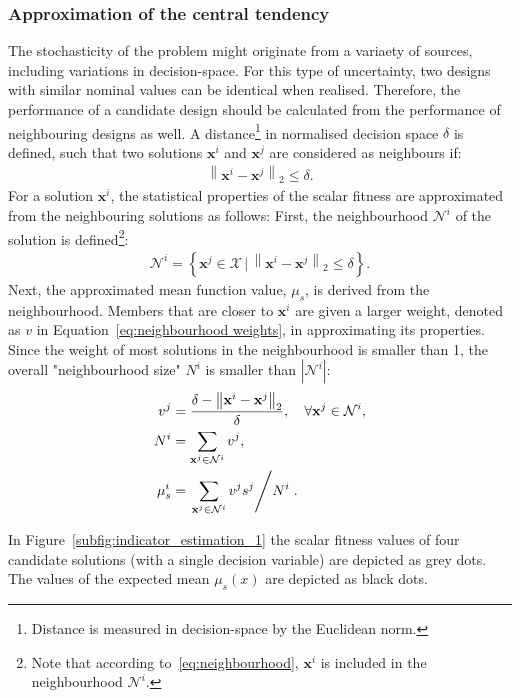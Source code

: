 \documentclass[10pt]{llncs}
\newcommand{\brr}[1]{{\left({#1}\right)}} %
\newcommand{\brf}[1]{\left\lbrace{#1}\right\rbrace} %
\newcommand{\brabs}[1]{\left\vert{#1}\right\vert} %
\newcommand{\norm}[2]{\left\|{#1}\right\|_{#2}} %
\newcommand{\vx}{\mathbf{x}} %
\newcommand{\NSet}{\mathcal{N}} %
\newcommand{\XSet}{\mathcal{X}} %
\begin{document}
\subsubsection{Approximation of the central tendency}
The stochasticity of the problem might originate from a variaety of sources, including variations in decision-space.
For this type of uncertainty, two designs with similar nominal values can be identical when realised.
Therefore, the performance of a candidate design should be calculated from the performance of neighbouring designs as well.
A distance\footnote{Distance is measured in decision-space by the Euclidean norm.} in normalised decision space $\delta$ is defined, such that two solutions $\vx^i$ and $\vx^j$ are considered as neighbours if:
\begin{align}
	\norm{\vx^i-\vx^j}{2}\leq\delta.
\end{align}
For a solution $\vx^i$, the statistical properties of the scalar fitness are approximated from the neighbouring solutions as follows:
First, the neighbourhood $\NSet^i$ of the solution is defined\footnote{Note that according to~\eqref{eq:neighbourhood}, $\vx^i$ is included in the neighbourhood $\NSet^i$.}:
\begin{align}
	\label{eq:neighbourhood}
	\NSet^i=\brf{\vx^j\in \XSet \,\vert \,\norm{\vx^i-\vx^j}{2}\leq\delta}.
\end{align}
Next, the approximated mean function value, $\mu_s$, is derived from the neighbourhood.
Members that are closer to $\vx^i$ are given a larger weight, denoted as $v$ in Equation~\eqref{eq:neighbourhood weights}, in approximating its properties.
Since the weight of most solutions in the neighbourhood is smaller than 1, the overall "neighbourhood size" $N^i$ is smaller than $\brabs{\NSet^i}$:
\begin{align}
	\label{eq:neighbourhood weights}
	v^j &= \frac{\delta-\norm{\vx^i-\vx^j}{2}}{\delta}, \quad  \forall \vx^j\in\NSet^i,\\
	\label{eq:neighbourhood size}
	N^i &= \sum_{\vx^j\in\NSet^i} v^j,\\
	\label{eq:neighbourhood mean}
	\mu^i_s &= \left. \sum_{\vx^j\in\NSet^i} v^j s^j \middle/ N^i \right. .
\end{align}

In Figure~\ref{subfig:indicator_estimation_1} the scalar fitness values of four candidate solutions (with a single decision variable) are depicted as grey dots.
The values of the expected mean $\mu_s\brr{x}$ are depicted as black dots.
\end{document}
